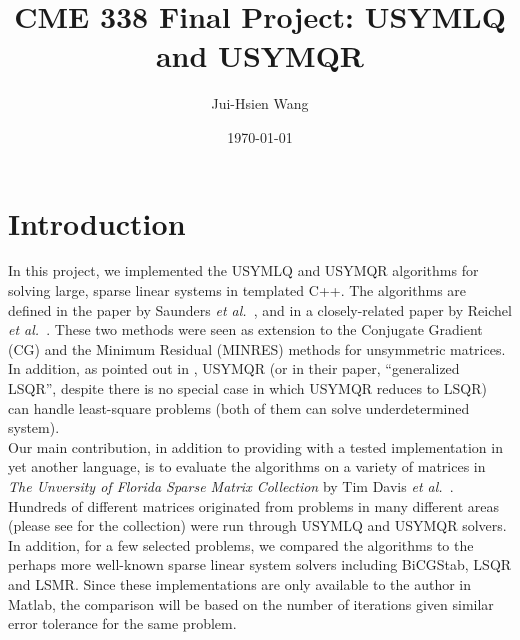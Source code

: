 \documentclass[10pt,letterpaper]{article}
\def\etal{\emph{et al.~}}
\begin{document}
\linespread{1} %
\small \normalsize %
\title{CME 338 Final Project: USYMLQ and USYMQR}
\date{\today}
\author{Jui-Hsien Wang}
\maketitle
\section{Introduction}
In this project, we implemented the USYMLQ and USYMQR algorithms for 
solving large, sparse linear systems in templated C++. The algorithms
are defined in the paper by Saunders \etal \cite{saunders:1988}, and 
in a closely-related paper by Reichel \etal \cite{reichel:2008}. These 
two methods were seen as extension to the Conjugate Gradient (CG) and 
the Minimum Residual (MINRES) methods for unsymmetric matrices. 
In addition, as pointed out in
\cite{reichel:2008}, USYMQR (or in their paper, ``generalized LSQR'', 
despite there is no special case in which USYMQR reduces to LSQR) can 
handle least-square problems (both of them can solve underdetermined 
system). \\

Our main contribution, in addition to providing with a tested 
implementation in yet another language, is to evaluate the algorithms 
on a variety of matrices in \emph{The Unversity of Florida Sparse 
Matrix Collection} by Tim Davis \etal \cite{davis:2011}. 
Hundreds of different matrices originated from problems in many 
different areas (please see \cite{davis:2011} for the collection) were 
run through USYMLQ and USYMQR solvers. In addition, for a few selected 
problems, we compared the algorithms to the perhaps more well-known 
sparse linear system solvers including BiCGStab, LSQR and LSMR. Since 
these implementations are only available to the author in Matlab, the 
comparison will be based on the number of iterations given similar 
error tolerance for the same problem. \\
\end{document}
